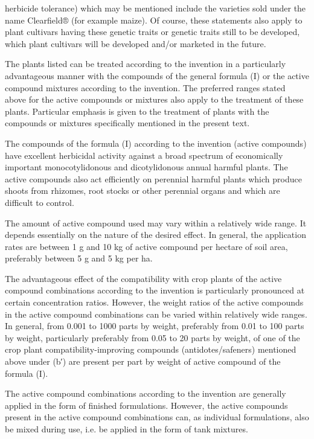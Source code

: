\documentclass[11pt,a4paper]{article}
\begin{document}
herbicide tolerance) which may be mentioned include the varieties sold under the name Clearfield® (for example maize). Of course, these statements also apply to plant cultivars having these genetic traits or genetic traits still to be developed, which plant cultivars will be developed and/or marketed in the future.

The plants listed can be treated according to the invention in a particularly advantageous manner with the compounds of the general formula (I) or the active compound mixtures according to the invention. The preferred ranges stated above for the active compounds or mixtures also apply to the treatment of these plants. Particular emphasis is given to the treatment of plants with the compounds or mixtures specifically mentioned in the present text.

The compounds of the formula (I) according to the invention (active compounds) have excellent herbicidal activity against a broad spectrum of economically important monocotylidonous and dicotylidonous annual harmful plants. The active compounds also act efficiently on perennial harmful plants which produce shoots from rhizomes, root stocks or other perennial organs and which are difficult to control.

The amount of active compound used may vary within a relatively wide range. It depends essentially on the nature of the desired effect. In general, the application rates are between 1 g and 10 kg of active compound per hectare of soil area, preferably between 5 g and 5 kg per ha.

The advantageous effect of the compatibility with crop plants of the active compound combinations according to the invention is particularly pronounced at certain concentration ratios. However, the weight ratios of the active compounds in the active compound combinations can be varied within relatively wide ranges. In general, from 0.001 to 1000 parts by weight, preferably from 0.01 to 100 parts by weight, particularly preferably from 0.05 to 20 parts by weight, of one of the crop plant compatibility-improving compounds (antidotes/safeners) mentioned above under (b′) are present per part by weight of active compound of the formula (I).

The active compound combinations according to the invention are generally applied in the form of finished formulations. However, the active compounds present in the active compound combinations can, as individual formulations, also be mixed during use, i.e. be applied in the form of tank mixtures.
\end{document}
